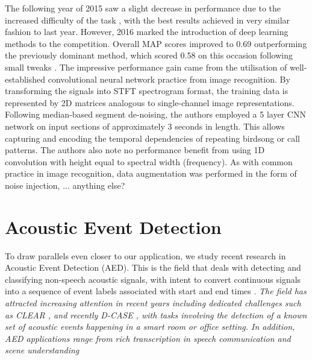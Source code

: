 \documentclass[12pt]{llncs}
\begin{document}
The following year of 2015 saw a slight decrease in performance due to the increased difficulty of the task \cite{goeau2015lifeclef}, with the best results achieved in very similar fashion to last year. However, 2016 marked the introduction of deep learning methods to the competition. Overall MAP scores improved to 0.69 outperforming the previously dominant method, which scored 0.58  on this occasion following small tweaks \cite{joly2016lifeclef}. The impressive performance gain came from the utilisation of well-established convolutional neural network practice from image recognition. By transforming the signals into STFT spectrogram format, the training data is represented by 2D matrices analogous to single-channel image representations. Following median-based segment de-noising, the authors employed a 5 layer CNN network on input sections of approximately 3 seconds in length. This allows capturing and encoding the temporal dependencies of repeating birdsong or call patterns. The authors also note no performance benefit from using 1D convolution with height equal to spectral width (frequency). As with common practice in image recognition, data augmentation was performed in the form of noise injection, ... anything else?




\section{Acoustic Event Detection}
\label{sec:AED}
To draw parallels even closer to our application, we study recent research in Acoustic Event Detection (AED). This is the field that deals with detecting and classifying non-speech acoustic signals, with intent to convert continuous signals into a sequence of event labels associated with start and end times \cite{espi2015exploiting}. \emph{The field has attracted increasing
attention in recent years including dedicated challenges
such as CLEAR \cite{mostefa2007chil}, and recently D-CASE \cite{giannoulis2013detection}, with tasks
involving the detection of a known set of acoustic events
happening in a smart room or office setting. In addition,
AED applications range from rich transcription in
speech communication \cite{mostefa2007chil,giannoulis2013detection} and scene understanding}
\end{document}
